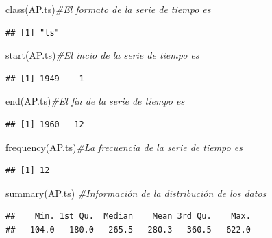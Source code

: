 \documentclass[
  spanish,
]{book}
\newenvironment{Shaded}{\begin{snugshade}}{\end{snugshade}}
\newcommand{\CommentTok}[1]{\textcolor[rgb]{0.56,0.35,0.01}{\textit{#1}}}
\newcommand{\FunctionTok}[1]{\textcolor[rgb]{0.00,0.00,0.00}{#1}}
\newcommand{\NormalTok}[1]{#1}
\theoremstyle{remark}
\begin{document}
\begin{Shaded}
\begin{Highlighting}[]
\FunctionTok{class}\NormalTok{(AP.ts)}\CommentTok{\#El formato de la serie de tiempo es}
\end{Highlighting}
\end{Shaded}

\begin{verbatim}
## [1] "ts"
\end{verbatim}

\begin{Shaded}
\begin{Highlighting}[]
\FunctionTok{start}\NormalTok{(AP.ts)}\CommentTok{\#El incio de la serie de tiempo es}
\end{Highlighting}
\end{Shaded}

\begin{verbatim}
## [1] 1949    1
\end{verbatim}

\begin{Shaded}
\begin{Highlighting}[]
\FunctionTok{end}\NormalTok{(AP.ts)}\CommentTok{\#El fin de la serie de tiempo es}
\end{Highlighting}
\end{Shaded}

\begin{verbatim}
## [1] 1960   12
\end{verbatim}

\begin{Shaded}
\begin{Highlighting}[]
\FunctionTok{frequency}\NormalTok{(AP.ts)}\CommentTok{\#La frecuencia de la serie de tiempo es}
\end{Highlighting}
\end{Shaded}

\begin{verbatim}
## [1] 12
\end{verbatim}

\begin{Shaded}
\begin{Highlighting}[]
\FunctionTok{summary}\NormalTok{(AP.ts) }\CommentTok{\#Información de la distribución de los datos}
\end{Highlighting}
\end{Shaded}

\begin{verbatim}
##    Min. 1st Qu.  Median    Mean 3rd Qu.    Max. 
##   104.0   180.0   265.5   280.3   360.5   622.0
\end{verbatim}
\end{document}
